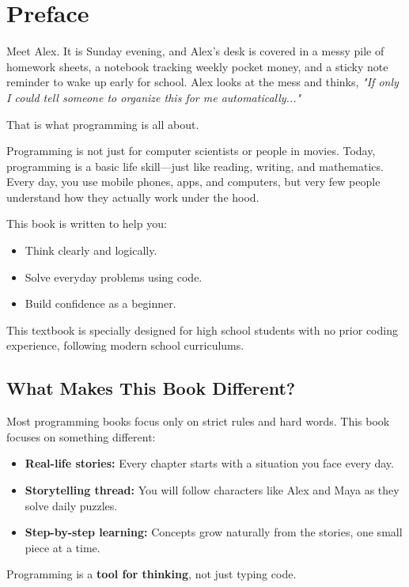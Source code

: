 \chapter*{Preface}

Meet Alex. It is Sunday evening, and Alex's desk is covered in a messy pile of homework sheets, a notebook tracking weekly pocket money, and a sticky note reminder to wake up early for school. Alex looks at the mess and thinks, \textit{"If only I could tell someone to organize this for me automatically..."}

That is what programming is all about.

Programming is not just for computer scientists or people in movies. Today, programming is a basic life skill—just like reading, writing, and mathematics. Every day, you use mobile phones, apps, and computers, but very few people understand how they actually work under the hood.

This book is written to help you:
\begin{itemize}
    \item Think clearly and logically.
    \item Solve everyday problems using code.
    \item Build confidence as a beginner.
\end{itemize}

This textbook is specially designed for high school students with no prior coding experience, following modern school curriculums.

\section*{What Makes This Book Different?}

Most programming books focus only on strict rules and hard words. This book focuses on something different:
\begin{itemize}
    \item \textbf{Real-life stories:} Every chapter starts with a situation you face every day.
    \item \textbf{Storytelling thread:} You will follow characters like Alex and Maya as they solve daily puzzles.
    \item \textbf{Step-by-step learning:} Concepts grow naturally from the stories, one small piece at a time.
\end{itemize}

Programming is a \textbf{tool for thinking}, not just typing code.

